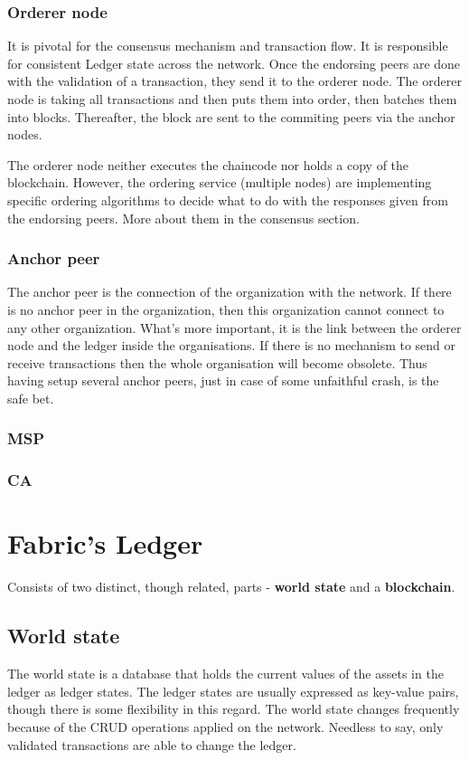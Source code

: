 \documentclass[a4paper,11pt]{report}
\begin{document}
\subsubsection{Orderer node}
It is pivotal for the consensus mechanism and transaction flow. It is responsible for consistent Ledger state across the network. Once the endorsing peers are done with the validation of a transaction, they send it to the orderer node. The orderer node is taking all transactions and then puts them into order, then batches them into blocks. Thereafter, the block are sent to the commiting peers via the anchor nodes.

	The orderer node neither executes the chaincode nor holds a copy of the blockchain. However, the ordering service (multiple nodes) are implementing specific ordering algorithms to decide what to do with the responses given from the endorsing peers. More about them in the consensus section.
\subsubsection{Anchor peer}
The anchor peer is the connection of the organization with the network. If there is no anchor peer in the organization, then this organization cannot connect to any other organization. What’s more important, it is the link between the orderer node and the ledger inside the organisations. If there is no mechanism to send or receive transactions then the whole organisation will become obsolete. Thus having setup several anchor peers, just in case of some unfaithful crash, is the safe bet.  

\subsubsection{MSP}

\subsubsection{CA}

\section{Fabric's Ledger}
\label{fabricLedger}
	Consists of two distinct, though related, parts - \textbf{world state} and  a \textbf{blockchain}.
	
\subsection{World state}
\label{ws}
The world state is a database that holds the current values of the assets in the ledger as ledger states. The ledger states are usually expressed as key-value pairs, though there is some flexibility in this regard. The world state changes frequently because of the CRUD operations applied on the network. Needless to say, only validated transactions are able to change the ledger.
\end{document}
